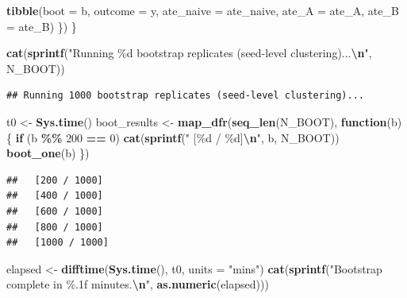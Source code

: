 \documentclass[
]{article}
\newenvironment{Shaded}{\begin{snugshade}}{\end{snugshade}}
\newcommand{\AttributeTok}[1]{\textcolor[rgb]{0.13,0.29,0.53}{#1}}
\newcommand{\ControlFlowTok}[1]{\textcolor[rgb]{0.13,0.29,0.53}{\textbf{#1}}}
\newcommand{\DecValTok}[1]{\textcolor[rgb]{0.00,0.00,0.81}{#1}}
\newcommand{\FunctionTok}[1]{\textcolor[rgb]{0.13,0.29,0.53}{\textbf{#1}}}
\newcommand{\NormalTok}[1]{#1}
\newcommand{\OtherTok}[1]{\textcolor[rgb]{0.56,0.35,0.01}{#1}}
\newcommand{\SpecialCharTok}[1]{\textcolor[rgb]{0.81,0.36,0.00}{\textbf{#1}}}
\newcommand{\StringTok}[1]{\textcolor[rgb]{0.31,0.60,0.02}{#1}}
\begin{document}
\begin{Shaded}
\begin{Highlighting}[]
    \FunctionTok{tibble}\NormalTok{(}\AttributeTok{boot =}\NormalTok{ b, }\AttributeTok{outcome =}\NormalTok{ y,}
           \AttributeTok{ate\_naive =}\NormalTok{ ate\_naive, }\AttributeTok{ate\_A =}\NormalTok{ ate\_A, }\AttributeTok{ate\_B =}\NormalTok{ ate\_B)}
\NormalTok{  \})}
\NormalTok{\}}

\FunctionTok{cat}\NormalTok{(}\FunctionTok{sprintf}\NormalTok{(}\StringTok{"Running \%d bootstrap replicates (seed{-}level clustering)...}\SpecialCharTok{\textbackslash{}n}\StringTok{"}\NormalTok{, N\_BOOT))}
\end{Highlighting}
\end{Shaded}

\begin{verbatim}
## Running 1000 bootstrap replicates (seed-level clustering)...
\end{verbatim}

\begin{Shaded}
\begin{Highlighting}[]
\NormalTok{t0 }\OtherTok{\textless{}{-}} \FunctionTok{Sys.time}\NormalTok{()}
\NormalTok{boot\_results }\OtherTok{\textless{}{-}} \FunctionTok{map\_dfr}\NormalTok{(}\FunctionTok{seq\_len}\NormalTok{(N\_BOOT), }\ControlFlowTok{function}\NormalTok{(b) \{}
  \ControlFlowTok{if}\NormalTok{ (b }\SpecialCharTok{\%\%} \DecValTok{200} \SpecialCharTok{==} \DecValTok{0}\NormalTok{) }\FunctionTok{cat}\NormalTok{(}\FunctionTok{sprintf}\NormalTok{(}\StringTok{"  [\%d / \%d]}\SpecialCharTok{\textbackslash{}n}\StringTok{"}\NormalTok{, b, N\_BOOT))}
  \FunctionTok{boot\_one}\NormalTok{(b)}
\NormalTok{\})}
\end{Highlighting}
\end{Shaded}

\begin{verbatim}
##   [200 / 1000]
##   [400 / 1000]
##   [600 / 1000]
##   [800 / 1000]
##   [1000 / 1000]
\end{verbatim}

\begin{Shaded}
\begin{Highlighting}[]
\NormalTok{elapsed }\OtherTok{\textless{}{-}} \FunctionTok{difftime}\NormalTok{(}\FunctionTok{Sys.time}\NormalTok{(), t0, }\AttributeTok{units =} \StringTok{"mins"}\NormalTok{)}
\FunctionTok{cat}\NormalTok{(}\FunctionTok{sprintf}\NormalTok{(}\StringTok{"Bootstrap complete in \%.1f minutes.}\SpecialCharTok{\textbackslash{}n}\StringTok{"}\NormalTok{, }\FunctionTok{as.numeric}\NormalTok{(elapsed)))}
\end{Highlighting}
\end{Shaded}
\end{document}
